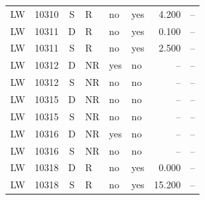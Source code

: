 \begin{longtable}{@{}llclllrl@{}}
LW & 10310 & S & R & no & yes & 4.200 & --\\
LW & 10311 & D & R & no & yes & 0.100 & --\\
LW & 10311 & S & R & no & yes & 2.500 & --\\
LW & 10312 & D & NR & yes & no & -- & --\\
LW & 10312 & S & NR & no & no & -- & --\\
LW & 10315 & D & NR & no & no & -- & --\\
LW & 10315 & S & NR & no & no & -- & --\\
LW & 10316 & D & NR & yes & no & -- & --\\
LW & 10316 & S & NR & no & no & -- & --\\
LW & 10318 & D & R & no & yes & 0.000 & --\\
LW & 10318 & S & R & no & yes & 15.200 & --\\
\end{longtable}\endgroup
